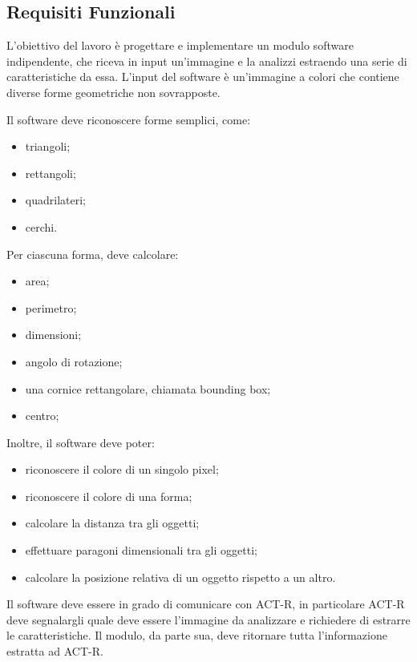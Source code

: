 		\subsection*{Requisiti Funzionali}
			L'obiettivo del lavoro è progettare e implementare un modulo software indipendente, che riceva in input un'immagine e la analizzi estraendo una serie di caratteristiche da essa.
			L'input del software è un'immagine a colori che contiene diverse forme geometriche non sovrapposte. 

			Il software deve riconoscere forme semplici, come:
			\begin{itemize}
	    		\item triangoli;
				\item rettangoli;
				\item quadrilateri;
				\item cerchi.
			\end{itemize}

			Per ciascuna forma, deve calcolare:
			\begin{itemize}
				\item area;
				\item perimetro;
				\item dimensioni;
				\item angolo di rotazione;
				\item una cornice rettangolare, chiamata bounding box;
				\item centro;
			\end{itemize}	
		
			Inoltre, il software deve poter:
			\begin{itemize}
				\item riconoscere il colore di un singolo pixel;
				\item riconoscere il colore di una forma;
				\item calcolare la distanza tra gli oggetti;			
				\item effettuare paragoni dimensionali tra gli oggetti;
				\item calcolare la posizione relativa di un oggetto rispetto a un altro.
			\end{itemize}

			Il software deve essere in grado di comunicare con \mbox{ACT-R}, in particolare \mbox{ACT-R} deve segnalargli quale deve essere l'immagine da analizzare e richiedere di estrarre le caratteristiche.
			Il modulo, da parte sua, deve ritornare tutta l'informazione estratta ad \mbox{ACT-R}.
		
